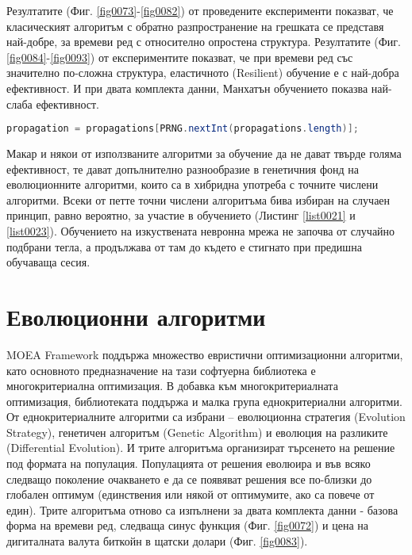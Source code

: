 Резултатите (Фиг. \ref{fig0073}-\ref{fig0082}) от проведените експерименти показват, че класическият алгоритъм с обратно разпространение на грешката се представя най-добре, за времеви ред с относително опростена структура. Резултатите (Фиг. \ref{fig0084}-\ref{fig0093}) от експериментите показват, че при времеви ред със значително по-сложна структура, еластичното (Resilient) обучение е с най-добра ефективност. И при двата комплекта данни, Манхатън обучението показва най-слаба ефективност. 

\begin{lstlisting}[caption=Случаен избор на точните числени методи, language=Java, basicstyle=\tiny, label=list0023]
propagation = propagations[PRNG.nextInt(propagations.length)];
\end{lstlisting}

Макар и някои от използваните алгоритми за обучение да не дават твърде голяма ефективност, те дават допълнително разнообразие в генетичния фонд на еволюционните алгоритми, които са в хибридна употреба с точните числени алгоритми. Всеки от петте точни числени алгоритъма бива избиран на случаен принцип, равно вероятно, за участие в обучението (Листинг \ref{list0021} и \ref{list0023}). Обучението на изкуствената невронна мрежа не започва от случайно подбрани тегла, а продължава от там до където е стигнато при предишна обучаваща сесия. 

\section{Еволюционни алгоритми}

MOEA Framework поддържа множество евристични оптимизационни алгоритми, като основното предназначение на тази софтуерна библиотека е многокритериална оптимизация. В добавка към многокритериалната оптимизация, библиотеката поддържа и малка група еднокритериални алгоритми. От еднокритериалните алгоритми са избрани – еволюционна стратегия (Evolution Strategy), генетичен алгоритъм (Genetic Algorithm) и еволюция на разликите (Differential Evolution). И трите алгоритъма организират търсенето на решение под формата на популация. Популацията от решения еволюира и във всяко следващо поколение очакването е да се появяват решения все по-близки до глобален оптимум (единствения или някой от оптимумите, ако са повече от един). Трите алгоритъма отново са изпълнени за двата комплекта данни - базова форма на времеви ред, следваща синус функция (Фиг. \ref{fig0072}) и цена на дигиталната валута биткойн в щатски долари (Фиг. \ref{fig0083}).


